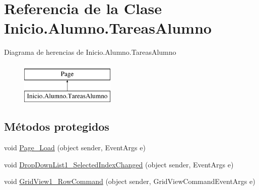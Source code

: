 \hypertarget{classInicio_1_1Alumno_1_1TareasAlumno}{}\section{Referencia de la Clase Inicio.\+Alumno.\+Tareas\+Alumno}
\label{classInicio_1_1Alumno_1_1TareasAlumno}
Diagrama de herencias de Inicio.\+Alumno.\+Tareas\+Alumno\begin{figure}[H]
\begin{center}
\leavevmode
\includegraphics[height=2.000000cm]{classInicio_1_1Alumno_1_1TareasAlumno}
\end{center}
\end{figure}
\subsection*{Métodos protegidos}
\begin{DoxyCompactItemize}
\item 
void \mbox{\hyperlink{classInicio_1_1Alumno_1_1TareasAlumno_a138bc452a7798faa63c4800b4a6d0cfe}{Page\+\_\+\+Load}} (object sender, Event\+Args e)
\item 
void \mbox{\hyperlink{classInicio_1_1Alumno_1_1TareasAlumno_ab7341d8a2105b51ae67ab7b551bfe8b8}{Drop\+Down\+List1\+\_\+\+Selected\+Index\+Changed}} (object sender, Event\+Args e)
\item 
void \mbox{\hyperlink{classInicio_1_1Alumno_1_1TareasAlumno_a71a8f5108e059c831491a9387aa8f6af}{Grid\+View1\+\_\+\+Row\+Command}} (object sender, Grid\+View\+Command\+Event\+Args e)
\end{DoxyCompactItemize}
